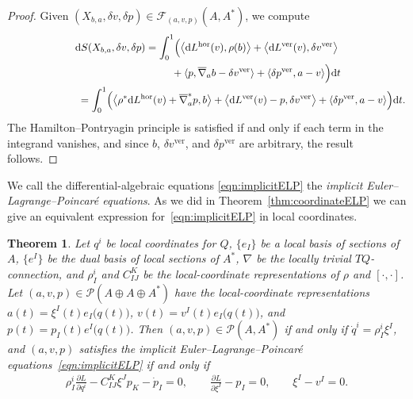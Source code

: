 \documentclass[pdftex]{sigma}
\numberwithin{equation}{section}
\newtheorem{Theorem}{Theorem}[section]
\begin{document}
\begin{proof} Given $ ( X _{ b, a } , \delta v, \delta p ) \in \mathcal{F} _{ (a,v,p) } ( A , A ^\ast ) $, we compute
 \begin{gather*}
 \mathrm{d} S ( X _{ b, a } , \delta v , \delta p ) = \int _0 ^1 \Bigl( \bigl\langle \mathrm{d} L ^\text{hor} (v) ,
 \rho (b) \bigr\rangle + \bigl\langle \mathrm{d} L ^\text{ver} (v), \delta v ^\text{ver} \bigr\rangle \\
 \hphantom{\mathrm{d} S ( X _{ b, a } , \delta v , \delta p ) = \int _0 ^1}{} + \langle p , \overline{ \nabla } _a
 b - \delta v ^\text{ver} \rangle + \langle \delta p^\text{ver} , a - v \rangle \Bigr) \mathrm{d}t\\
\hphantom{\mathrm{d} S ( X _{ b, a } , \delta v , \delta p )}{}
 = \int _0 ^1 \Bigl( \bigl\langle \rho ^\ast \mathrm{d} L ^\text{hor} (v) + \overline{ \nabla } _a ^\ast p , b
 \bigr\rangle + \bigl\langle \mathrm{d} L ^\text{ver} (v) - p , \delta v ^\text{ver} \bigr\rangle + \langle \delta p ^\text{ver}, a - v \rangle \Bigr)
\mathrm{d}t .
 \end{gather*}
 The Hamilton--Pontryagin principle is satisf\/ied if and only if each term in the integrand vanishes, and since $b$, $ \delta v ^\text{ver} $, and $ \delta p ^\text{ver} $ are arbitrary, the result follows.
\end{proof}

We call the dif\/ferential-algebraic equations \eqref{eqn:implicitELP} the \emph{implicit Euler--Lagrange--Poincar\'e equations}. As we did in Theorem~\ref{thm:coordinateELP} we can give an equivalent expression for~\eqref{eqn:implicitELP} in local coordinates.

\begin{Theorem}
Let $ q ^i $ be local coordinates for $Q$, $ \{ e _I \} $ be a local basis of sections of $A$, $ \{ e ^I \} $ be the dual basis of local sections of $ A ^\ast $, $ \nabla $ be the locally trivial $ T Q $-connection, and $ \rho ^i _I $ and $ C _{ I J } ^K $ be the local-coordinate representations of $ \rho $ and $ [\cdot , \cdot ] $. Let $ ( a, v, p ) \in \mathcal{P} ( A \oplus A \oplus A ^\ast ) $ have the local-coordinate representations $ a (t) = \xi ^I (t) e _I \bigl( q (t) \bigr) $, $ v (t) = v ^I (t) e _I \bigl( q (t) \bigr) $, and $ p (t) = p _I (t) e ^I \bigl( q (t) \bigr) $. Then $ ( a, v, p ) \in \mathcal{P} ( A , A ^\ast ) $ if and only if $ \dot{q} ^i = \rho ^i _I \xi ^I $, and $ ( a, v, p ) $ satisfies the implicit Euler--Lagrange--Poincar\'e equations~\eqref{eqn:implicitELP} if and only if
\begin{gather*}
\rho ^i _I \frac{ \partial L }{ \partial q ^i } - C ^K _{ I J } \xi ^J p _K - \dot{p} _I = 0 , \qquad
\frac{ \partial L }{ \partial \xi ^I } - p _I = 0 , \qquad \xi ^I - v ^I = 0 .
\end{gather*}
\end{Theorem}
\end{document}
